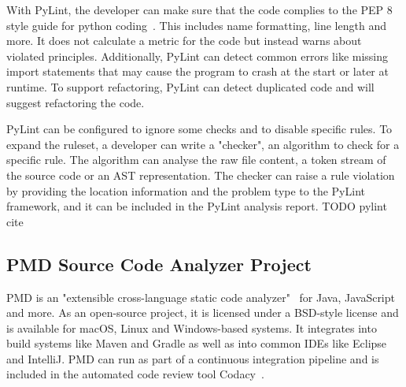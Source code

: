 With PyLint, the developer can make sure that the code complies to the PEP 8 style guide for python coding~\cite{pep8}. This includes name formatting, line length and more. It does not calculate a metric for the code but instead warns about violated principles. Additionally, PyLint can detect common errors like missing import statements that may cause the program to crash at the start or later at runtime. To support refactoring, PyLint can detect duplicated code and will suggest refactoring the code.

PyLint can be configured to ignore some checks and to disable specific rules. To expand the ruleset, a developer can write a "checker", an algorithm to check for a specific rule. The algorithm can analyse the raw file content, a token stream of the source code or an AST representation. The checker can raise a rule violation by providing the location information and the problem type to the PyLint framework, and it can be included in the PyLint analysis report. TODO pylint cite

\subsection{PMD Source Code Analyzer Project}
PMD is an "extensible cross-language static code analyzer"~\cite{noauthor_pmd_nodate} for Java, JavaScript and more. As an open-source project, it is licensed under a BSD-style license and is available for macOS, Linux and Windows-based systems. It integrates into build systems like Maven and Gradle as well as into common IDEs like Eclipse and IntelliJ. PMD can run as part of a continuous integration pipeline and is included in the automated code review tool Codacy~\cite{noauthor_codacy_nodate-1}.

